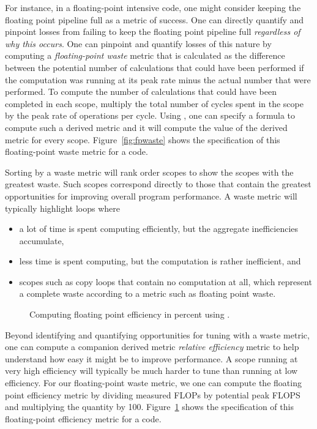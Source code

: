 \documentclass[11pt,letterpaper]{report}
\begin{document}
For instance, in a floating-point intensive code, one might consider keeping the floating point pipeline full as a metric of success.
One can directly quantify and pinpoint losses from failing to keep the floating point pipeline full {\em regardless of why this occurs}.
One can pinpoint and quantify losses of this nature by computing a {\em floating-point waste} metric that is calculated as the difference between the potential number of calculations that could have been performed if the computation was running at its peak rate minus the actual number that were performed.
To compute the number of calculations that could have been completed in each scope, multiply the total number of cycles spent in the scope by the peak rate of operations per cycle.
Using \hpcviewer{}, one can specify a formula to compute such a derived metric and it will compute the value of the derived metric for every scope.
Figure~\ref{fig:fpwaste} shows the specification of this floating-point waste metric for a code.

Sorting by a waste metric will rank order scopes to show the scopes with the greatest waste.
Such scopes correspond directly to those that contain the greatest opportunities for improving overall program performance.
A waste metric will typically highlight loops where
\begin{itemize}
\item a lot of time is spent computing efficiently, but the aggregate inefficiencies accumulate,
\item less time is spent computing, but the computation is rather inefficient, and
\item scopes such as copy loops that contain no computation at all, which represent a complete waste according to a metric such as floating point waste.
\end{itemize}

\begin{figure}[t]
\caption{Computing floating point efficiency in percent using \hpcviewer{}.}
\label{fig:fpefficiency}
\end{figure}

Beyond identifying and quantifying opportunities for tuning with a waste metric, one can compute a companion derived metric {\em relative efficiency} metric to help understand how easy it might be to improve performance.
A scope running at very high efficiency will typically be much harder to tune than running at low efficiency.
For our floating-point waste metric, we one can compute the floating point efficiency metric by dividing measured FLOPs by potential peak FLOPS and multiplying the quantity by 100.
Figure~\ref{fig:fpefficiency} shows the specification of this floating-point efficiency metric for a code.
\end{document}

